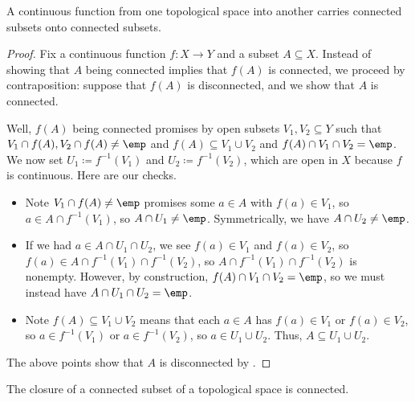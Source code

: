 \documentclass[../notes.tex]{subfiles}
\begin{document}
\begin{lemma} \label{lem:ivt}
	A continuous function from one topological space into another carries connected subsets onto connected subsets.
\end{lemma}
\begin{proof}
	Fix a continuous function $f\colon X\to Y$ and a subset $A\subseteq X$. Instead of showing that $A$ being connected implies that $f(A)$ is connected, we proceed by contraposition: suppose that $f(A)$ is disconnected, and we show that $A$ is connected.

	Well, $f(A)$ being connected promises by  open subsets $V_1,V_2\subseteq Y$ such that $V_1\cap f(A),V_2\cap f(A)\ne\emp$ and $f(A)\subseteq V_1\cup V_2$ and $f(A)\cap V_1\cap V_2=\emp$. We now {set $U_1\coloneqq f^{-1}(V_1)$ and $U_2\coloneqq f^{-1}(V_2)$}, which are open in $X$ because $f$ is continuous. Here are our checks.
	\begin{itemize}
		\item Note $V_1\cap f(A)\ne\emp$ promises some $a\in A$ with $f(a)\in V_1$, so $a\in A\cap f^{-1}(V_1)$, so $A\cap U_1\ne\emp$. Symmetrically, we have $A\cap U_2\ne\emp$.
		\item If we had $a\in A\cap U_1\cap U_2$, we see $f(a)\in V_1$ and $f(a)\in V_2$, so $f(a)\in A\cap f^{-1}(V_1)\cap f^{-1}(V_2)$, so $A\cap f^{-1}(V_1)\cap f^{-1}(V_2)$ is nonempty. However, by construction, $f(A)\cap V_1\cap V_2=\emp$, so we must instead have $A\cap U_1\cap U_2=\emp$.
		\item Note $f(A)\subseteq V_1\cup V_2$ means that each $a\in A$ has $f(a)\in V_1$ or $f(a)\in V_2$, so $a\in f^{-1}(V_1)$ or $a\in f^{-1}(V_2)$, so $a\in U_1\cup U_2$. Thus, $A\subseteq U_1\cup U_2$.
	\end{itemize}
	The above points show that $A$ is disconnected by .
\end{proof}
\begin{lemma} \label{lem:closureisconn}
	The closure of a connected subset of a topological space is connected.
\end{lemma}
\end{document}

